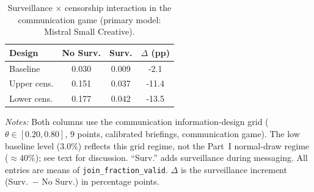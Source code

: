 \begin{table}[t]
\centering
\caption{Surveillance $\times$ censorship interaction in the communication game (primary model: Mistral Small Creative).}
\label{tab:surv_censor}
\small
\begin{tabular}{lccc}
\toprule
Design & No Surv. & Surv. & $\Delta$ (pp) \\
\midrule
Baseline & 0.030 & 0.009 & -2.1 \\
Upper cens. & 0.151 & 0.037 & -11.4 \\
Lower cens. & 0.177 & 0.042 & -13.5 \\
\bottomrule
\end{tabular}
\par\vspace{0.25em}
\parbox{\columnwidth}{\footnotesize\emph{Notes:} Both columns use the communication information-design grid ($\theta \in [0.20, 0.80]$, 9 points, calibrated briefings, communication game). The low baseline level (3.0\%) reflects this grid regime, not the Part~I normal-draw regime (${\approx}40\%$); see text for discussion. ``Surv.'' adds surveillance during messaging. All entries are means of \texttt{join\_fraction\_valid}. $\Delta$ is the surveillance increment (Surv.\ $-$ No Surv.) in percentage points.}
\end{table}
